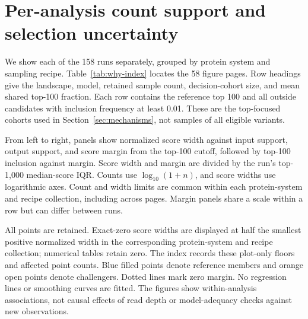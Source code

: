 
\clearpage



\clearpage
\section{Per-analysis count support and selection uncertainty}
\label{app:per-analysis-why}

We show each of the 158 runs separately, grouped by protein system
and sampling recipe. Table~\ref{tab:why-index} locates the 58 figure
pages. Row headings give the landscape, model, retained sample
count, decision-cohort size, and mean shared top-100 fraction.
Each row contains the reference top 100 and all outside candidates
with inclusion frequency at least 0.01. These are the top-focused
cohorts used in Section~\ref{sec:mechanisms}, not samples of all
eligible variants.

From left to right, panels show normalized score width against
input support, output support, and score margin from the top-100
cutoff, followed by top-100 inclusion against margin. Score width
and margin are divided by the run's top-1,000 median-score IQR.
Counts use $\log_{10}(1+n)$, and score widths use logarithmic axes.
Count and width limits are common within each protein-system
and recipe collection, including across pages. Margin panels
share a scale within a row but can differ between runs.

All points are retained. Exact-zero score widths are displayed
at half the smallest positive normalized width in the corresponding
protein-system and recipe collection; numerical tables retain
zero. The index records these plot-only floors and affected point
counts. Blue filled points denote reference members and orange
open points denote challengers. Dotted lines mark zero margin.
No regression lines or smoothing curves are fitted. The figures
show within-analysis associations, not causal effects of read
depth or model-adequacy checks against new observations.

